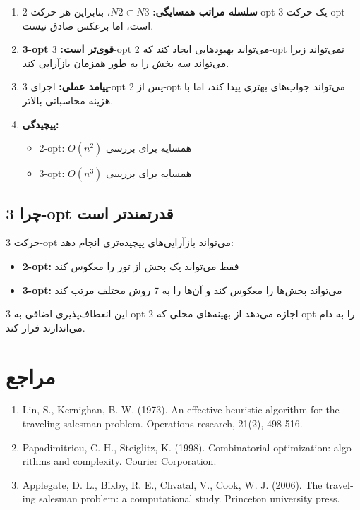 \documentclass[12pt,a4paper]{article}
\begin{document}
\begin{enumerate}
    \item \textbf{سلسله مراتب همسایگی:} $N2 \subset N3$، بنابراین هر حرکت 2-opt یک حرکت 3-opt است، اما برعکس صادق نیست.
    
    \item \textbf{3-opt قوی‌تر است:} 3-opt می‌تواند بهبودهایی ایجاد کند که 2-opt نمی‌تواند زیرا می‌تواند سه بخش را به طور همزمان بازآرایی کند.
    
    \item \textbf{پیامد عملی:} اجرای 3-opt پس از 2-opt می‌تواند جواب‌های بهتری پیدا کند، اما با هزینه محاسباتی بالاتر.
    
    \item \textbf{پیچیدگی:}
    \begin{itemize}
        \item 2-opt: $O(n^2)$ همسایه برای بررسی
        \item 3-opt: $O(n^3)$ همسایه برای بررسی
    \end{itemize}
\end{enumerate}

\subsection{چرا 3-opt قدرتمندتر است}

حرکت 3-opt می‌تواند بازآرایی‌های پیچیده‌تری انجام دهد:

\begin{itemize}
    \item \textbf{2-opt:} فقط می‌تواند یک بخش از تور را معکوس کند
    \item \textbf{3-opt:} می‌تواند بخش‌ها را معکوس کند و آن‌ها را به 7 روش مختلف مرتب کند
\end{itemize}

این انعطاف‌پذیری اضافی به 3-opt اجازه می‌دهد از بهینه‌های محلی که 2-opt را به دام می‌اندازند فرار کند.

\section{مراجع}

\begin{english}
\begin{enumerate}
    \item Lin, S., Kernighan, B. W. (1973). An effective heuristic algorithm for the traveling-salesman problem. Operations research, 21(2), 498-516.
    
    \item Papadimitriou, C. H., Steiglitz, K. (1998). Combinatorial optimization: algorithms and complexity. Courier Corporation.
    
    \item Applegate, D. L., Bixby, R. E., Chvatal, V., Cook, W. J. (2006). The traveling salesman problem: a computational study. Princeton university press.
\end{enumerate}
\end{english}
\end{document}
